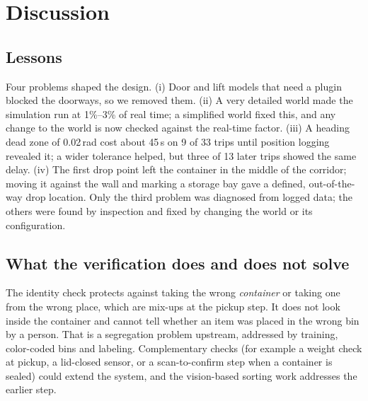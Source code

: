 \documentclass[conference]{IEEEtran}
\begin{document}
\section{Discussion}\label{sec:discussion}
\subsection{Lessons}
Four problems shaped the design. (i) Door and lift models that need a plugin blocked the doorways, so we removed them. (ii) A very detailed world made the simulation run at 1\%--3\% of real time; a simplified world fixed this, and any change to the world is now checked against the real-time factor. (iii) A heading dead zone of 0.02\,rad cost about 45\,s on 9 of 33 trips until position logging revealed it; a wider tolerance helped, but three of 13 later trips showed the same delay. (iv) The first drop point left the container in the middle of the corridor; moving it against the wall and marking a storage bay gave a defined, out-of-the-way drop location. Only the third problem was diagnosed from logged data; the others were found by inspection and fixed by changing the world or its configuration.

\subsection{What the verification does and does not solve}
The identity check protects against taking the wrong \emph{container} or taking one from the wrong place, which are mix-ups at the pickup step. It does not look inside the container and cannot tell whether an item was placed in the wrong bin by a person. That is a segregation problem upstream, addressed by training, color-coded bins and labeling. Complementary checks (for example a weight check at pickup, a lid-closed sensor, or a scan-to-confirm step when a container is sealed) could extend the system, and the vision-based sorting work \cite{shaju2023medwaste,tasnim2022voice,bonifacio2025review} addresses the earlier step.
\end{document}
